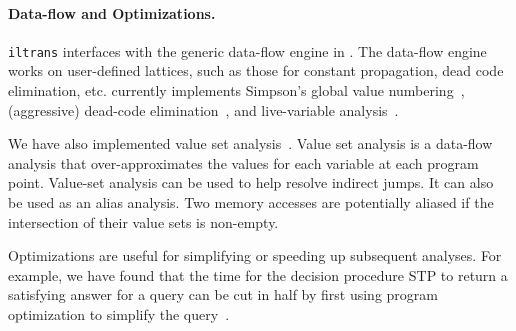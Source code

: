 \paragraph{Data-flow and Optimizations.} {\tt iltrans} interfaces with
the generic data-flow engine in \bap.  The data-flow engine works on
user-defined lattices, such as those for constant propagation, dead
code elimination, etc.  \bap currently implements
Simpson's global value numbering~\cite{simpson:1996}, (aggressive)
dead-code elimination~\cite{muchnick:1997}, and live-variable
analysis~\cite{muchnick:1997}.

We have also implemented value set
analysis~\cite{balakrishnan:2007}. Value set analysis is a data-flow
analysis that over-approximates the values for each variable at each
program point. Value-set analysis can be used to help resolve indirect
jumps. It can also be used as an alias analysis.  Two memory accesses
are potentially aliased if the intersection of their value sets is
non-empty.


Optimizations are useful for simplifying or speeding up subsequent
analyses. For example, we have found that the time for the decision
procedure STP to return a satisfying answer for a query can be cut in
half by first using program optimization to simplify the
query~\cite{brumley:2008}.

